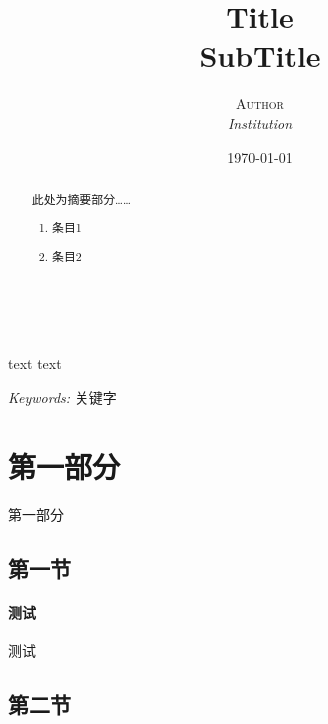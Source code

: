 \documentclass[a4paper, 11pt, hyperref, UTF8]{ctexart} %
\title{\textbf{Title}\\ %
SubTitle} %
\author{\textsc{Author} %
\\{\textit{Institution}}} %
\date{\today} %
\makeatletter
\renewcommand{\maketitle}{ %
\begin{flushleft} %
{\LARGE\@title} %

\vspace{50pt} %

{\large\@author} %
\\\@date %

\vspace{40pt} %
\end{flushleft}
}
\makeatother
\begin{document}
\maketitle %
text\cite{rogers2011first} text\cite{harrington2012machine} %


\begin{abstract}
此处为摘要部分……

\begin{enumerate}
\item 条目1
\item 条目2
\end{enumerate}

\end{abstract}

\hspace*{3,6mm}\textit{Keywords:} 关键字 %

\vspace{30pt} %


\section{第一部分}

第一部分
\subsection{第一节}
\paragraph{测试}测试

\subsection{第二节}
\end{document}
